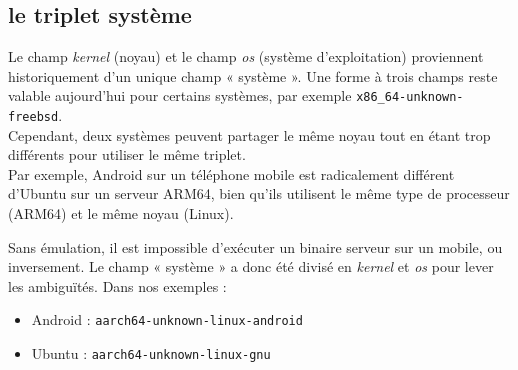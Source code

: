 \begin{appendix}
\section{le triplet système} \label{sec:triplet}
\medskip

Le champ \textit{kernel} (noyau) et le champ \textit{os} (système d'exploitation) proviennent historiquement 
d'un unique champ « système ». Une forme à trois champs reste valable aujourd'hui pour certains systèmes, 
par exemple \texttt{x86\_64-unknown-freebsd}.\\
Cependant, deux systèmes peuvent partager le même noyau tout 
en étant trop différents pour utiliser le même triplet. \\
Par exemple, Android sur un téléphone mobile est 
radicalement différent d'Ubuntu sur un serveur ARM64, bien qu'ils utilisent le même type de processeur 
(ARM64) et le même noyau (Linux).

Sans émulation, il est impossible d'exécuter un binaire serveur sur un mobile, ou inversement. Le champ 
« système » a donc été divisé en \textit{kernel} et \textit{os} pour lever les ambiguïtés. Dans nos exemples :
\begin{itemize}
    \item Android : \texttt{aarch64-unknown-linux-android}
    \item Ubuntu : \texttt{aarch64-unknown-linux-gnu}
\end{itemize}




\end{appendix}
